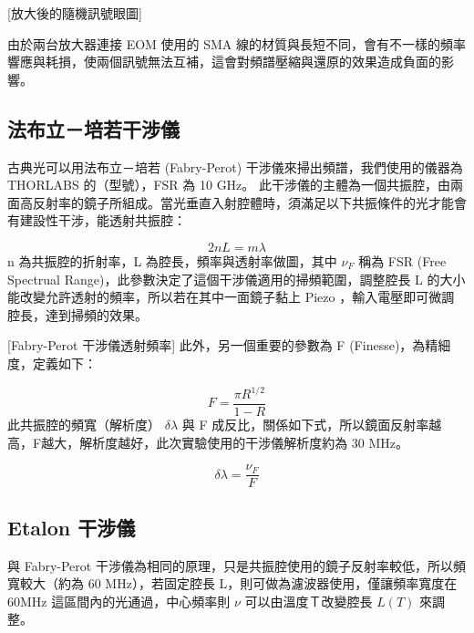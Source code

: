 \documentclass[class=NCU_thesis, crop=false]{standalone}
\begin{document}
[放大後的隨機訊號眼圖]

由於兩台放大器連接 EOM 使用的 SMA 線的材質與長短不同，會有不一樣的頻率響應與耗損，使兩個訊號無法互補，這會對頻譜壓縮與還原的效果造成負面的影響。

\subsection{法布立－培若干涉儀}
古典光可以用法布立－培若 (Fabry-Perot) 干涉儀來掃出頻譜，我們使用的儀器為 THORLABS 的（型號），FSR 為 10 GHz。
此干涉儀的主體為一個共振腔，由兩面高反射率的鏡子所組成。當光垂直入射腔體時，須滿足以下共振條件的光才能會有建設性干涉，能透射共振腔：

\begin{equation}
    2nL=m\lambda
\end{equation}
n 為共振腔的折射率，L 為腔長，頻率與透射率做圖，其中 $\nu_{F}$ 稱為 FSR (Free Spectrual Range)，此參數決定了這個干涉儀適用的掃頻範圍，調整腔長 L 的大小能改變允許透射的頻率，所以若在其中一面鏡子黏上 Piezo ，輸入電壓即可微調腔長，達到掃頻的效果。

[Fabry-Perot 干涉儀透射頻率]
此外，另一個重要的參數為 F (Finesse)，為精細度，定義如下：

\begin{equation}
    F=\frac{\pi R^{1/2}}{1-R}
\end{equation}
此共振腔的頻寬（解析度） $\delta \lambda$ 與 F 成反比，關係如下式，所以鏡面反射率越高，F越大，解析度越好，此次實驗使用的干涉儀解析度約為 30 MHz。

\begin{equation}
    \delta \lambda=\frac{\nu_{F}}{F}
\end{equation}

\subsection{Etalon 干涉儀}
與 Fabry-Perot 干涉儀為相同的原理，只是共振腔使用的鏡子反射率較低，所以頻寬較大（約為 60 MHz），若固定腔長 L，則可做為濾波器使用，僅讓頻率寬度在 60MHz 這區間內的光通過，中心頻率則 $\nu$ 可以由溫度Ｔ改變腔長 $L(T)$ 來調整。
\end{document}
